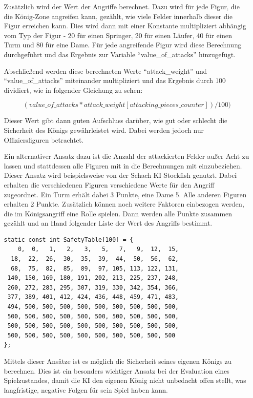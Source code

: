 Zusätzlich wird der Wert der Angriffe berechnet. Dazu wird für jede Figur, die die König-Zone angreifen kann, gezählt, wie viele Felder innerhalb dieser die Figur erreichen kann. Dies wird dann mit einer Konstante multipliziert abhängig vom Typ der Figur - 20 für einen Springer, 20 für einen Läufer, 40 für einen Turm und 80 für eine Dame. Für jede angreifende Figur wird diese Berechnung durchgeführt und das Ergebnis zur Variable ``value\_of\_attacks'' hinzugefügt. 

Abschließend werden diese berechneten Werte ``attack\_weight'' und ``value\_of\_attacks'' miteinander multipliziert und das Ergebnis durch 100 dividiert, wie in folgender Gleichung zu sehen:

\begin{equation}
(value\_of\_attacks * attack\_weight[attacking\_pieces\_counter]) / 100)
\end{equation}

Dieser Wert gibt dann guten Aufschluss darüber, wie gut oder schlecht die Sicherheit des Königs gewährleistet wird. Dabei werden jedoch nur Offiziersfiguren betrachtet.

Ein alternativer Ansatz dazu ist die Anzahl der attackierten Felder außer Acht zu lassen und stattdessen alle Figuren mit in die Berechnungen mit einzubeziehen. Dieser Ansatz wird beispielsweise von der Schach KI Stockfish genutzt. Dabei erhalten die verschiedenen Figuren verschiedene Werte für den Angriff zugeordnet. Ein Turm erhält dabei 3 Punkte, eine Dame 5. Alle anderen Figuren erhalten 2 Punkte. Zusätzlich können noch weitere Faktoren einbezogen werden, die im Königsangriff eine Rolle spielen. Dann werden alle Punkte zusammen gezählt und an Hand folgender Liste der Wert des Angriffs bestimmt.

\begin{lstlisting}
static const int SafetyTable[100] = {
    0,  0,   1,   2,   3,   5,   7,   9,  12,  15,
  18,  22,  26,  30,  35,  39,  44,  50,  56,  62,
  68,  75,  82,  85,  89,  97, 105, 113, 122, 131,
 140, 150, 169, 180, 191, 202, 213, 225, 237, 248,
 260, 272, 283, 295, 307, 319, 330, 342, 354, 366,
 377, 389, 401, 412, 424, 436, 448, 459, 471, 483,
 494, 500, 500, 500, 500, 500, 500, 500, 500, 500,
 500, 500, 500, 500, 500, 500, 500, 500, 500, 500,
 500, 500, 500, 500, 500, 500, 500, 500, 500, 500,
 500, 500, 500, 500, 500, 500, 500, 500, 500, 500
};
\end{lstlisting}

Mittels dieser Ansätze ist es möglich die Sicherheit seines eigenen Königs zu berechnen. Dies ist ein besonders wichtiger Ansatz bei der Evaluation eines Spielzustandes, damit die KI den eigenen König nicht unbedacht offen stellt, was langfristige, negative Folgen für sein Spiel haben kann. 

